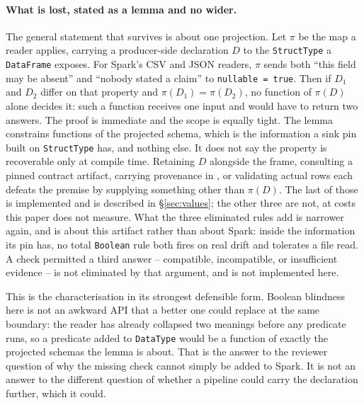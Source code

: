 \paragraph{What is lost, stated as a lemma and no wider.}
\label{sec:lemma}
The general statement that survives is about one projection. Let $\pi$ be the map a reader applies, carrying a producer-side declaration $D$ to the \texttt{StructType} a \texttt{DataFrame} exposes. For Spark's CSV and JSON readers, $\pi$ sends both ``this field may be absent'' and ``nobody stated a claim'' to \texttt{nullable = true}. Then if $D_1$ and $D_2$ differ on that property and $\pi(D_1) = \pi(D_2)$, no function of $\pi(D)$ alone decides it: such a function receives one input and would have to return two answers. The proof is immediate and the scope is equally tight. The lemma constrains functions of the projected schema, which is the information a sink pin built on \texttt{StructType} has, and nothing else. It does not say the property is recoverable only at compile time. Retaining $D$ alongside the frame, consulting a pinned contract artifact, carrying provenance in , or validating actual rows each defeats the premise by supplying something other than $\pi(D)$. The last of those is implemented and is described in \S\ref{sec:values}; the other three are not, at costs this paper does not measure. What the three eliminated rules add is narrower again, and is about this artifact rather than about Spark: inside the information its pin has, no total \texttt{Boolean} rule both fires on real drift and tolerates a file read. A check permitted a third answer -- compatible, incompatible, or insufficient evidence -- is not eliminated by that argument, and is not implemented here.

This is the characterisation in its strongest defensible form. Boolean blindness here is not an awkward API that a better one could replace at the same boundary: the reader has already collapsed two meanings before any predicate runs, so a predicate added to \texttt{DataType} would be a function of exactly the projected schemas the lemma is about. That is the answer to the reviewer question of why the missing check cannot simply be added to Spark. It is not an answer to the different question of whether a pipeline could carry the declaration further, which it could.

